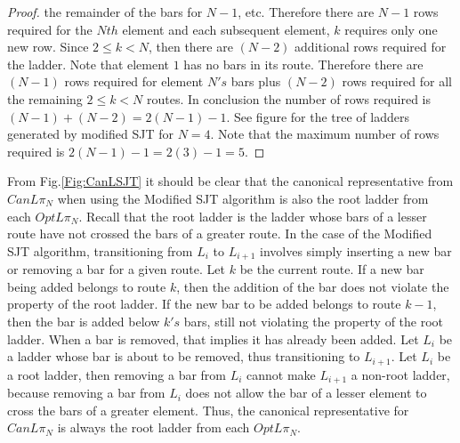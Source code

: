 \begin{proof}
  the remainder of the bars for $N-1$, etc. Therefore there are $N-1$ rows required for the $Nth$ element and each subsequent 
  element, $k$ requires only one new row. Since $2 \leq k < N$, then there are $(N-2)$ additional rows required for the ladder. Note that element 
  $1$ has no bars in its route. Therefore there are $(N-1)$ rows required for element $N's$ bars  plus $(N-2)$ rows required for 
  all the remaining $2 \leq k < N$ routes. In conclusion the number of rows required is $(N-1) + (N-2) = 2(N-1)-1$. 
  See figure for the tree of ladders 
  generated by modified SJT for $N=4$. Note that the maximum number of rows required is $2(N-1)-1=2(3)-1=5$.
\end{proof}





From Fig.\ref{Fig:CanLSJT} it should be clear that the canonical representative from $CanL{\pi_{N}}$ when using the 
Modified SJT algorithm is also the root ladder from each $OptL{\pi_{N}}$. Recall that the root ladder is the 
ladder whose bars of a lesser route have not crossed the bars of a greater route. In the case of the 
Modified SJT algorithm, transitioning from $L_{i}$ to $L_{i+1}$ involves simply inserting a new bar 
or removing a bar for a given route. Let $k$ be the current route. If a new bar being added belongs to 
route $k$, then the addition of the bar does not violate the property of the root ladder. If the new bar to
be added belongs to route $k-1$, then the bar is added below $k's$ bars, still not violating the property of 
the root ladder. When a bar is removed, that implies it has already been added. Let $L_{i}$ be a 
ladder whose bar is about to be removed, thus transitioning to $L_{i+1}$. Let $L_{i}$ be a root ladder, 
then removing a bar from $L_{i}$ cannot make $L_{i+1}$ a non-root ladder, because 
removing a bar from $L_{i}$ does not allow the bar of a lesser element to cross the bars of a greater element.
Thus, the canonical representative for $CanL{\pi_{N}}$ is always the root ladder from each $OptL{\pi_{N}}$.\par 



